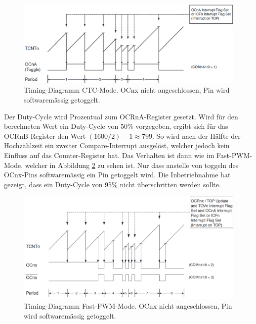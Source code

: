 \begin{figure}[h!]
	\centering
	\includegraphics[width=\textwidth]{graphics/Timer_CTC_Timing_Diagram}
	\caption{Timing-Diagramm CTC-Mode. OCnx nicht angeschlossen, Pin wird softwaremässig getoggelt.\cite[S.146]{atmel_atmel_2014}}
	\label{fig:Timer_CTC_Timing_Diagram}
\end{figure}

Der Duty-Cycle wird Prozentual zum OCRnA-Register gesetzt. Wird für den berechneten Wert ein Duty-Cycle von 50\% vorgegeben, ergibt sich für das OCRnB-Register den Wert $(1600 / 2) -1 \approx 799$. So wird nach der Hälfte der Hochzählzeit ein zweiter Compare-Interrupt ausgelöst, welcher jedoch kein Einfluss auf das Counter-Register hat. Das Verhalten ist dann wie im Fast-PWM-Mode, welcher in Abbildung \ref{fig:Timer_Fast_PWM_Timing_Diagram} zu sehen ist. Nur dass anstelle von toggeln des OCnx-Pins softwaremässig ein Pin getoggelt wird. Die Inbetriebnahme hat gezeigt, dass ein Duty-Cycle von 95\% nicht überschritten werden sollte.

\begin{figure}[h!]
	\centering
	\includegraphics[width=\textwidth]{graphics/Timer_Fast_PWM_Timing_Diagram}
	\caption{Timing-Diagramm Fast-PWM-Mode. OCnx nicht angeschlossen, Pin wird softwaremässig getoggelt.\cite[S.147]{atmel_atmel_2014}}
	\label{fig:Timer_Fast_PWM_Timing_Diagram}
\end{figure}

